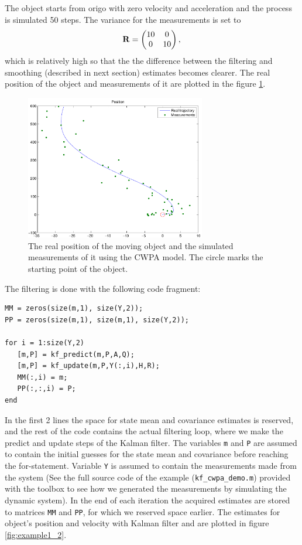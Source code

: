 The object starts from origo with zero velocity and acceleration
and the process is simulated 50 steps. The variance for the measurements is set to
%
\begin{equation}
\mathbf{R} = \begin{pmatrix}
10 & 0  \\
0  & 10 \\
\end{pmatrix},
\end{equation}
%
which is relatively high so that the the difference between the filtering and
smoothing (described in next section) estimates becomes clearer. The real
position of the object and measurements of it are plotted in the figure
\ref{fig:example1_1}. 

\begin{figure}
\begin{center}
\includegraphics[width=0.7\textwidth]{pics/demo1_f1}
\caption{The real position of the moving object and the simulated
  measurements of it using the CWPA model. The circle marks the
  starting point of the object.}
\label{fig:example1_1}
\end{center}
\end{figure}

The filtering is done with the following code fragment:
%
\begin{lstlisting}
MM = zeros(size(m,1), size(Y,2));
PP = zeros(size(m,1), size(m,1), size(Y,2));

for i = 1:size(Y,2)
   [m,P] = kf_predict(m,P,A,Q);
   [m,P] = kf_update(m,P,Y(:,i),H,R);
   MM(:,i) = m;
   PP(:,:,i) = P;
end
\end{lstlisting}
%
In the first 2 lines the space for state mean and covariance estimates is
reserved, and the rest of the code contains the actual filtering loop, where
we make the predict and update steps of the Kalman filter. The variables
\texttt{m} and \texttt{P} are assumed to contain the initial guesses for the
state mean and covariance before reaching the for-statement. Variable
\texttt{Y} is assumed to contain the measurements made from the system
(See the full source code of the example (\texttt{kf\_cwpa\_demo.m}) provided with the toolbox
to see how we generated the measurements by simulating the dynamic system). In
the end of each iteration the acquired estimates are stored to matrices
\texttt{MM} and \texttt{PP}, for which we reserved space earlier. The estimates
for object's position and velocity with Kalman filter and are plotted in figure
\ref{fig:example1_2}.\\

